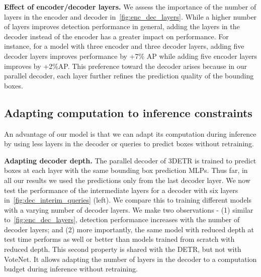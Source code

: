 \documentclass[10pt,twocolumn,letterpaper]{article}
\newcommand{\OURS}{3DETR\xspace}
\begin{document}
\vspace{0.06in}
\par \noindent \textbf{Effect of encoder/decoder layers.}
We assess the importance of the number of layers in the encoder and decoder in~\cref{fig:enc_dec_layers}.
While a higher number of layers improves detection performance in general, adding the layers in the decoder instead of the encoder has a greater impact on performance.
For instance, for a model with three encoder and three decoder layers, adding five decoder layers improves performance by +7\% AP while adding five encoder layers improves by +2\%AP.
This preference toward the decoder arises because in our parallel decoder, each layer further refines the prediction quality of the bounding boxes.

\subsection{Adapting computation to inference constraints}
\label{sec:adaptive}
An advantage of our model is that we can adapt its computation during inference by using less layers in the decoder or queries to predict boxes without retraining.

\vspace{0.06in}
\par \noindent \textbf{Adapting decoder depth.} 
The parallel decoder of \OURS is trained to predict boxes at each layer with the same bounding box prediction MLPs.
Thus far, in all our results we used the predictions only from the last decoder layer.
We now test the performance of the intermediate layers for a decoder with six layers in~\cref{fig:dec_interim_queries} (left).
We compare this to training different models with a varying number of decoder layers.
We make two observations - (1) similar to~\cref{fig:enc_dec_layers}, detection performance increases with the number of decoder layers; and (2) more importantly, the same model with reduced depth at test time performs as well or better than models trained from scratch with reduced depth.
This second property is shared with the DETR, but not with VoteNet.
It allows adapting the number of layers in the decoder to a computation budget during inference without retraining.
\end{document}

